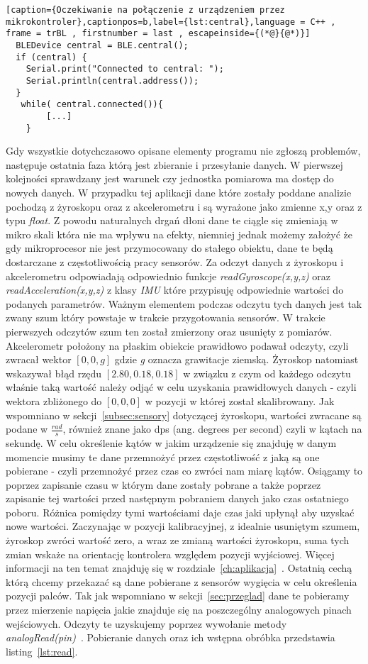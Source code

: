 \begin{lstlisting}[caption={Oczekiwanie na połączenie z urządzeniem przez mikrokontroler},captionpos=b,label={lst:central},language = C++ , frame = trBL , firstnumber = last , escapeinside={(*@}{@*)}]
  BLEDevice central = BLE.central();
  if (central) {
    Serial.print("Connected to central: ");
    Serial.println(central.address());
  }  
   while( central.connected()){ 
   		[...]
   	}
\end{lstlisting}
Gdy wszystkie dotychczasowo opisane elementy programu nie zgłoszą problemów, następuje ostatnia faza którą jest zbieranie i przesyłanie danych. W pierwszej kolejności sprawdzany jest warunek czy jednostka pomiarowa ma dostęp do nowych danych. W przypadku tej aplikacji dane które zostały poddane analizie pochodzą z żyroskopu oraz z akcelerometru i są wyrażone jako zmienne x,y oraz z typu \textit{float}. Z powodu naturalnych drgań dłoni dane te ciągle się zmieniają w mikro skali która nie ma wpływu na efekty, niemniej jednak możemy założyć że gdy mikroprocesor nie jest przymocowany do stałego obiektu, dane te będą dostarczane z częstotliwością pracy sensorów. Za odczyt danych z żyroskopu i akcelerometru odpowiadają odpowiednio funkcje \textit{readGyroscope(x,y,z)} oraz \textit{readAcceleration(x,y,z)} z klasy \textit{IMU} które przypisuję odpowiednie wartości do podanych parametrów. Ważnym elementem podczas odczytu tych danych jest tak zwany szum który powstaje w trakcie przygotowania sensorów. W trakcie pierwszych odczytów szum ten został zmierzony oraz usunięty z pomiarów. Akcelerometr położony na płaskim obiekcie prawidłowo podawał odczyty, czyli zwracał wektor $[0,0,g]$ gdzie \textit{g} oznacza grawitacje ziemską. Żyroskop natomiast wskazywał błąd rzędu $[2.80,0.18,0.18]$ w związku  z czym od każdego odczytu właśnie taką wartość należy odjąć w celu uzyskania prawidłowych danych - czyli wektora zbliżonego do $[0,0,0]$ w pozycji w której został skalibrowany. Jak wspomniano w sekcji~\ref{subsec:sensory} dotyczącej żyroskopu, wartości zwracane są podane w {\Large $\frac{rad}{s}$}, również znane jako dps (ang. degrees per second) czyli w kątach na sekundę. W celu określenie kątów w jakim urządzenie się znajduję w danym momencie musimy te dane przemnożyć przez częstotliwość z jaką są one pobierane - czyli przemnożyć przez czas co zwróci nam miarę kątów. Osiągamy to poprzez zapisanie czasu w którym dane zostały pobrane a także poprzez zapisanie tej wartości przed następnym pobraniem danych jako czas ostatniego poboru. Różnica pomiędzy tymi wartościami daje czas jaki upłynął aby uzyskać nowe wartości. Zaczynając w pozycji kalibracyjnej, z idealnie usuniętym szumem, żyroskop zwróci wartość zero, a wraz ze zmianą wartości żyroskopu, suma tych zmian wskaże na orientację kontrolera względem pozycji wyjściowej. Więcej informacji na ten temat znajduję się w rozdziale~\ref{ch:aplikacja}~\cite{gimbal}. Ostatnią cechą którą chcemy przekazać są dane pobierane z sensorów wygięcia w celu określenia pozycji palców. Tak jak wspomniano w sekcji~\ref{sec:przeglad} dane te pobieramy przez mierzenie napięcia jakie znajduje się na poszczególny analogowych pinach wejściowych. Odczyty te uzyskujemy poprzez wywołanie metody \textit{analogRead(pin)}~\cite{ArduinoDoc}. Pobieranie danych oraz ich wstępna obróbka przedstawia listing~\ref{lst:read}.
